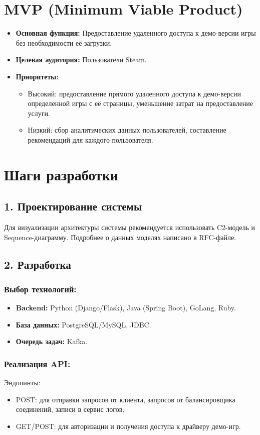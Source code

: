 \documentclass[12pt, a4paper]{article}
\begin{document}
\section*{MVP (Minimum Viable Product)}
\begin{itemize}
    \item \textbf{Основная функция:} Предоставление удаленного доступа к демо-версии игры без необходимости её загрузки.
    \item \textbf{Целевая аудитория:} Пользователи Steam.
    \item \textbf{Приоритеты:}
    \begin{itemize}
        \item Высокий: предоставление прямого удаленного доступа к демо-версии определенной игры с её страницы, уменьшение затрат на предоставление услуги.
        \item Низкий: сбор аналитических данных пользователей, составление рекомендаций для каждого пользователя.
    \end{itemize}
\end{itemize}

\section*{Шаги разработки}
\subsection*{1. Проектирование системы}
Для визуализации архитектуры системы рекомендуется использовать C2-модель и Sequence-диаграмму. Подробнее о данных моделях написано в RFC-файле.

\subsection*{2. Разработка}
\subsubsection*{Выбор технологий:}
\begin{itemize}
    \item \textbf{Backend:} Python (Django/Flask), Java (Spring Boot), GoLang, Ruby.
    \item \textbf{База данных:} PostgreSQL/MySQL, JDBC.
    \item \textbf{Очередь задач:} Kafka.
\end{itemize}

\subsubsection*{Реализация API:}
Эндпоинты:
\begin{itemize}
    \item POST: для отправки запросов от клиента, запросов от балансировщика соединений, записи в сервис логов.
    \item GET/POST: для авторизации и получения доступа к драйверу демо-игр.
\end{itemize}
\end{document}
